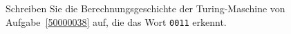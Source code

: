 Schreiben Sie die Berechnungsgeschichte der Turing-Maschine von
Aufgabe~\ref{50000038} auf, die das Wort \texttt{0011} erkennt.

\begin{loesung}
\end{loesung}

